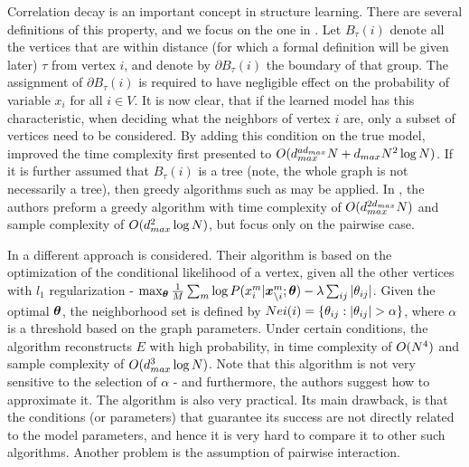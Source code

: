 Correlation decay is an important concept in structure learning.
There are several definitions of this property, and we focus on the one in \cite{montanari2009graphical}.
Let $B_{\tau}(i)$ denote all the vertices that are within distance (for which a formal definition will be given later) $\tau$ from vertex $i$, and denote by $\partial B_{\tau}(i)$ the boundary of that group.
The assignment of $\partial B_{\tau}(i)$ is required to have negligible effect on the probability of variable $x_i$ for all $i \in V$.
It is now clear, that if the learned model has this characteristic, when deciding what the neighbors of vertex $i$ are, only a subset of vertices need to be considered.
By adding this condition on the true model, \cite{bresler2008reconstruction} improved the time complexity first presented to $O(d_{max}^{ad_{max}}N+d_{max}N^2\log N)$.
If it is further assumed that $B_{\tau}(i)$ is a tree (note, the whole graph is not necessarily a tree), then greedy algorithms such as \cite{netrapalli2010greedy, anandkumar2013learning} may be applied.
In \cite{anandkumar2013learning}, the authors preform a greedy algorithm with time complexity of $O(d_{max}^{2d_{max}}{N})$ and sample complexity of $O(d_{max}^2\log N)$, but focus only on the pairwise case.  

In \cite{ravikumar2010high} a different approach is considered. Their algorithm is based on the optimization of the conditional likelihood of a vertex, given all the other vertices with $l_1$ regularization - $\max_{\boldsymbol{\theta}} \frac{1}{M}\sum_m \log P(x^{m}_i| \boldsymbol{x}^m_{\setminus i};\boldsymbol{\theta}) - \lambda \sum_{ij} |\theta_{ij}|$.
Given the optimal $\boldsymbol{\theta}$, the neighborhood set is defined by $Nei(i) = \{\theta_{ij} : |\theta_{ij}| > \alpha\}$, where $\alpha$ is a threshold based on the graph parameters.
Under certain conditions, the algorithm reconstructs $E$ with high probability, in time complexity of $O({N}^4)$ and sample complexity of $O( d_{max}^3 \log {N})$.
Note that this algorithm is not very sensitive to the selection of $\alpha$ - and furthermore, the authors suggest how to approximate it.
The algorithm is also very practical.
Its main drawback, is that the conditions (or parameters) that guarantee its success are not directly related to the model parameters, and hence it is very hard to compare it to other such algorithms. Another problem is the assumption of pairwise interaction.     

